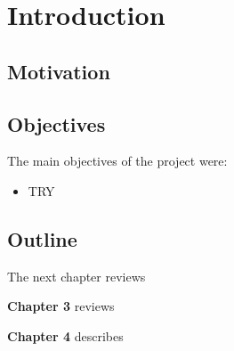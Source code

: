 \chapter{Introduction}

 

\section{Motivation}


\section{Objectives}

The main objectives of the project were:

\begin{itemize}
\item TRY
\end{itemize}



\section{Outline}
The next chapter reviews 

\textbf{Chapter 3} reviews 

\textbf{Chapter 4} describes 







